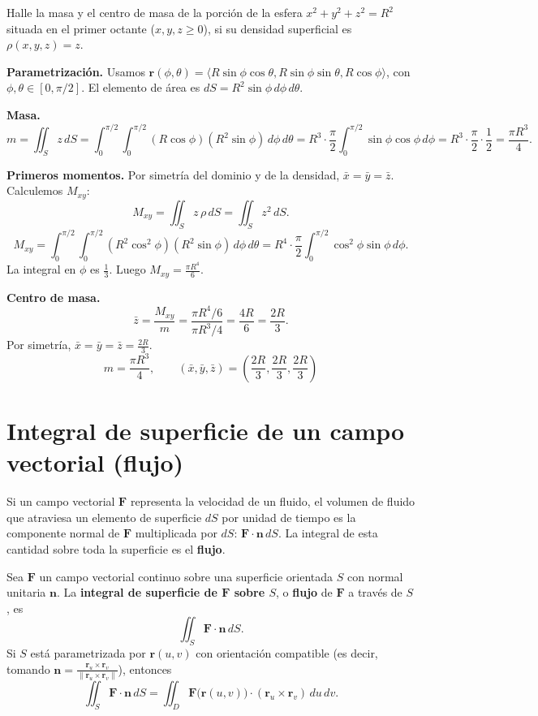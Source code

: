 \begin{example}
Halle la masa y el centro de masa de la porción de la esfera $x^2+y^2+z^2=R^2$ situada en el primer octante ($x,y,z\ge 0$), si su densidad superficial es $\rho(x,y,z)=z$.
\end{example}

\begin{myproof}
\textbf{Parametrización.}
Usamos $\mathbf{r}(\phi,\theta)=\langle R\sin\phi\cos\theta, R\sin\phi\sin\theta, R\cos\phi\rangle$, con $\phi,\theta\in[0,\pi/2]$. El elemento de área es $dS=R^2\sin\phi\,d\phi\,d\theta$.

\textbf{Masa.}
\[
m = \iint_S z\,dS
= \int_0^{\pi/2}\int_0^{\pi/2} (R\cos\phi)(R^2\sin\phi)\,d\phi\,d\theta
= R^3 \cdot \frac{\pi}{2} \int_0^{\pi/2} \sin\phi\cos\phi\,d\phi
= R^3 \cdot \frac{\pi}{2} \cdot \frac{1}{2}
= \frac{\pi R^3}{4}.
\]

\textbf{Primeros momentos.}
Por simetría del dominio y de la densidad, $\bar{x}=\bar{y}=\bar{z}$. Calculemos $M_{xy}$:
\[
M_{xy} = \iint_S z\,\rho\,dS = \iint_S z^2\,dS.
\]
\[
M_{xy} = \int_0^{\pi/2}\int_0^{\pi/2} (R^2\cos^2\phi)(R^2\sin\phi)\,d\phi\,d\theta
= R^4 \cdot \frac{\pi}{2} \int_0^{\pi/2} \cos^2\phi\sin\phi\,d\phi.
\]
La integral en $\phi$ es $\frac{1}{3}$. Luego $M_{xy} = \frac{\pi R^4}{6}$.

\textbf{Centro de masa.}
\[
\bar{z} = \frac{M_{xy}}{m} = \frac{\pi R^4/6}{\pi R^3/4} = \frac{4R}{6} = \frac{2R}{3}.
\]
Por simetría, $\bar{x}=\bar{y}=\bar{z}=\frac{2R}{3}$.
\[
\boxed{m = \frac{\pi R^3}{4}, \qquad (\bar{x},\bar{y},\bar{z}) = \left(\frac{2R}{3},\frac{2R}{3},\frac{2R}{3}\right)}
\]
\end{myproof}

\section{Integral de superficie de un campo vectorial (flujo)}

Si un campo vectorial $\mathbf{F}$ representa la velocidad de un fluido, el volumen de fluido que atraviesa un elemento de superficie $dS$ por unidad de tiempo es la componente normal de $\mathbf{F}$ multiplicada por $dS$: $\mathbf{F}\cdot\mathbf{n}\,dS$. La integral de esta cantidad sobre toda la superficie es el \textbf{flujo}.

\begin{definition}
Sea $\mathbf{F}$ un campo vectorial continuo sobre una superficie orientada $S$ con normal unitaria $\mathbf{n}$. La \textbf{integral de superficie de $\mathbf{F}$ sobre $S$}, o \textbf{flujo} de $\mathbf{F}$ a través de $S$, es
\[
\iint_S \mathbf{F}\cdot\mathbf{n}\,dS.
\]
Si $S$ está parametrizada por $\mathbf{r}(u,v)$ con orientación compatible (es decir, tomando $\mathbf{n} = \frac{\mathbf{r}_u \times \mathbf{r}_v}{\|\mathbf{r}_u \times \mathbf{r}_v\|}$), entonces
\[
\iint_S \mathbf{F}\cdot\mathbf{n}\,dS
=
\iint_D \mathbf{F}\bigl(\mathbf{r}(u,v)\bigr)\cdot(\mathbf{r}_u \times \mathbf{r}_v)\,du\,dv.
\]
\end{definition}

